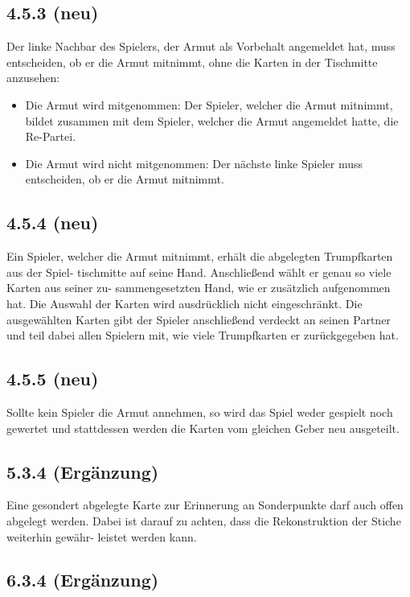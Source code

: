 \subsection*{4.5.3 (neu)} 

Der linke Nachbar des Spielers, der Armut als Vorbehalt angemeldet hat, 
muss entscheiden, ob er die Armut mitnimmt, ohne die Karten in der 
Tischmitte anzusehen: 

\begin{itemize}
	\item Die Armut wird mitgenommen: Der Spieler, welcher die Armut
		mitnimmt, bildet zusammen mit dem Spieler, welcher die Armut 
		angemeldet hatte, die Re-Partei.
	\item Die Armut wird nicht mitgenommen: Der nächste linke Spieler
		muss entscheiden, ob er die Armut mitnimmt. 
\end{itemize} 

\subsection*{4.5.4 (neu)} 

Ein Spieler, welcher die Armut mitnimmt, erhält die abgelegten 
Trumpfkarten aus der Spiel- tischmitte auf seine Hand. Anschließend 
wählt er genau so viele Karten aus seiner zu- sammengesetzten Hand, wie 
er zusätzlich aufgenommen hat. Die Auswahl der Karten wird 
ausdrücklich nicht eingeschränkt. Die ausgewählten Karten gibt der 
Spieler anschließend verdeckt an seinen Partner und teil dabei allen 
Spielern mit, wie viele Trumpfkarten er zurückgegeben hat. 

\subsection*{4.5.5 (neu)} 

Sollte kein Spieler die Armut annehmen, so wird das Spiel weder gespielt 
noch gewertet und stattdessen werden die Karten vom gleichen Geber neu 
ausgeteilt. 

\subsection*{5.3.4 (Ergänzung)} 

Eine gesondert abgelegte Karte zur Erinnerung an Sonderpunkte darf auch 
offen abgelegt werden. Dabei ist darauf zu achten, dass die 
Rekonstruktion der Stiche weiterhin gewähr- leistet werden kann. 

\subsection*{6.3.4 (Ergänzung)} 

